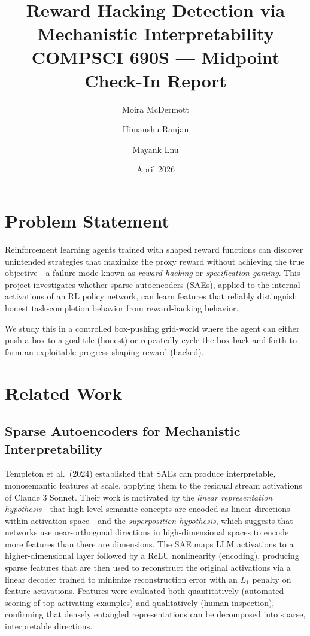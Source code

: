 \documentclass[11pt]{article}
\title{Reward Hacking Detection via Mechanistic Interpretability\\[4pt]
\large COMPSCI 690S --- Midpoint Check-In Report}
\author{Moira McDermott \and Himanshu Ranjan \and Mayank Lnu}
\date{April 2026}
\begin{document}
\maketitle

\section{Problem Statement}

Reinforcement learning agents trained with shaped reward functions can discover unintended strategies that maximize the proxy reward without achieving the true objective---a failure mode known as \emph{reward hacking} or \emph{specification gaming}.  This project investigates whether sparse autoencoders (SAEs), applied to the internal activations of an RL policy network, can learn features that reliably distinguish honest task-completion behavior from reward-hacking behavior.

We study this in a controlled box-pushing grid-world where the agent can either push a box to a goal tile (honest) or repeatedly cycle the box back and forth to farm an exploitable progress-shaping reward (hacked).

\section{Related Work}

\subsection{Sparse Autoencoders for Mechanistic Interpretability}

Templeton et al.\ (2024) established that SAEs can produce interpretable, monosemantic features at scale, applying them to the residual stream activations of Claude 3 Sonnet.  Their work is motivated by the \emph{linear representation hypothesis}---that high-level semantic concepts are encoded as linear directions within activation space---and the \emph{superposition hypothesis}, which suggests that networks use near-orthogonal directions in high-dimensional spaces to encode more features than there are dimensions.  The SAE maps LLM activations to a higher-dimensional layer followed by a ReLU nonlinearity (encoding), producing sparse features that are then used to reconstruct the original activations via a linear decoder trained to minimize reconstruction error with an $L_1$ penalty on feature activations.  Features were evaluated both quantitatively (automated scoring of top-activating examples) and qualitatively (human inspection), confirming that densely entangled representations can be decomposed into sparse, interpretable directions.
\end{document}
